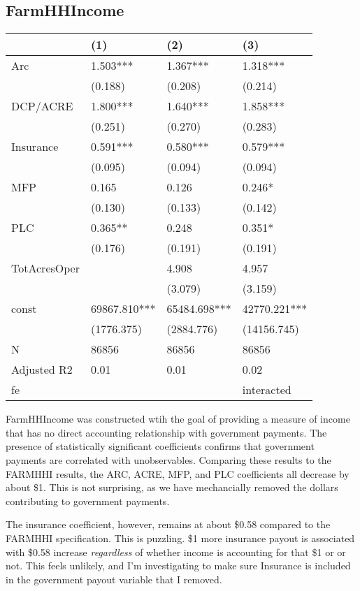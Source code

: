 \documentclass[11pt]{article}
\begin{document}
\subsection{FarmHHIncome}
\label{sec:org54e64c6}
\begin{center}
\begin{tabular}{llll}
\hline
 & (1) & (2) & (3)\\[0pt]
\hline
Arc & 1.503*** & 1.367*** & 1.318***\\[0pt]
 & (0.188) & (0.208) & (0.214)\\[0pt]
DCP/ACRE & 1.800*** & 1.640*** & 1.858***\\[0pt]
 & (0.251) & (0.270) & (0.283)\\[0pt]
Insurance & 0.591*** & 0.580*** & 0.579***\\[0pt]
 & (0.095) & (0.094) & (0.094)\\[0pt]
MFP & 0.165 & 0.126 & 0.246*\\[0pt]
 & (0.130) & (0.133) & (0.142)\\[0pt]
PLC & 0.365** & 0.248 & 0.351*\\[0pt]
 & (0.176) & (0.191) & (0.191)\\[0pt]
TotAcresOper &  & 4.908 & 4.957\\[0pt]
 &  & (3.079) & (3.159)\\[0pt]
const & 69867.810*** & 65484.698*** & 42770.221***\\[0pt]
 & (1776.375) & (2884.776) & (14156.745)\\[0pt]
N & 86856 & 86856 & 86856\\[0pt]
Adjusted R2 & 0.01 & 0.01 & 0.02\\[0pt]
fe &  &  & interacted\\[0pt]
\end{tabular}
\end{center}

FarmHHIncome was constructed wtih the goal of providing a measure of income that has no direct accounting relationship with government payments. The presence of statistically significant coefficients confirms that government payments are correlated with unobservables. Comparing these results to the FARMHHI results, the ARC, ACRE, MFP, and PLC coefficients all decrease by about \$1. This is not surprising, as we have mechancially removed the dollars contributing to government payments.

The insurance coefficient, however, remains at about \$0.58 compared to the FARMHHI specification. This is puzzling. \$1 more insurance payout is associated with \$0.58 increase \emph{regardless} of whether income is accounting for that \$1 or or not. This feels unlikely, and I'm investigating to make sure Insurance is included in the government payout variable that I removed.
\end{document}
